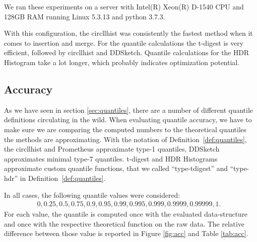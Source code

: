 \documentclass{article}
\theoremstyle{plain}
\theoremstyle{remark}
\begin{document}
We ran these experiments on a server with Intel(R) Xeon(R) D-1540 CPU and 128GB RAM running
Linux 5.3.13 and python 3.7.3.

With this configuration, the circllhist was consistently the fastest method when it comes to
insertion and merge.  For the quantile calculations the t-digest is very efficient, followed by
circllhist and DDSketch. Quantile calculations for the HDR Histogram take a lot longer, which
probably indicates optimization potential.

\subsection{Accuracy}

As we have seen in section \ref{sec:quantiles}, there are a number of different quantile definitions
circulating in the wild. When evaluating quantile accuracy, we have to make sure we are comparing
the computed numbers to the theoretical quantiles the methods are approximating.  With the notation
of Definition~\ref{def:quantiles}, the circllhist and Prometheus approximate type-1 quantiles,
DDSketch approximates minimal type-7 quantiles.
t-digest and HDR Histograms approximate custom quantile functions, that we called ``type-tdigest''
and ``type-hdr'' in Definition~\ref{def:quantiles}.

In all cases, the following quantile values were considered:
\begin{align*}
 0, 0.25, 0.5, 0.75, 0.9, 0.95, 0.99, 0.995, 0.999, 0.9999, 0.99999, 1.
\end{align*}
For each value, the quantile is computed once with the evaluated data-structure and once with the
respective theoretical function on the raw data. The relative difference between those value is
reported in Figure \ref{fig:acc} and Table \ref{tab:acc}.
\end{document}
